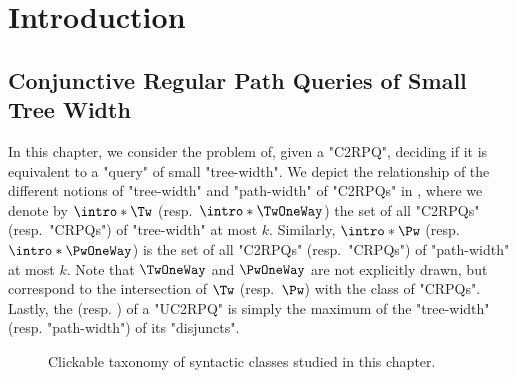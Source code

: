 \section{\AP{}Introduction}
\label{sec:intro}

\subsection{Conjunctive Regular Path Queries of Small Tree Width}

In this chapter, we consider the problem of, given a "C2RPQ", deciding
if it is equivalent to a "query" of small "tree-width".
We depict the relationship of the different notions of
"tree-width" and "path-width" of "C2RPQs" in ,
where we denote by $\intro*\Tw$ (resp.\ $\intro*\TwOneWay$) the set of all "C2RPQs" (resp.\ "CRPQs") of "tree-width" at most $k$. 
Similarly, \AP$\intro*\Pw$ (resp.\ $\intro*\PwOneWay$) is the set of all "C2RPQs" (resp.\ "CRPQs") of "path-width" at most $k$.
Note that $\TwOneWay$ and $\PwOneWay$ are not explicitly drawn, but correspond to the
intersection of $\Tw$ (resp.\ $\Pw$) with the class of "CRPQs".
Lastly, the  (resp. ) of a "UC2RPQ" is simply the maximum of the "tree-width" (resp. "path-width") of its "disjuncts".

\begin{figure}
	\centering
	\caption{
		\AP\label{fig:taxonomy-syntactic}
		Clickable taxonomy of syntactic classes studied in this chapter.
	}
\end{figure}

